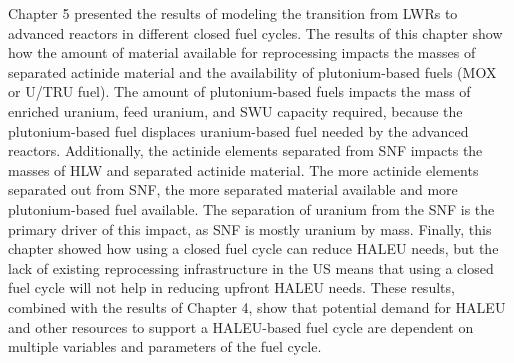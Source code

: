 Chapter 5 presented the results of modeling the transition from 
\glspl{LWR} to advanced reactors in different closed fuel cycles. 
The results of this chapter show how the amount of material 
available for reprocessing impacts the masses of separated 
actinide material and the availability of plutonium-based 
fuels (\gls{MOX} or U/TRU fuel). The amount of plutonium-based 
fuels impacts the 
mass of enriched uranium, feed uranium, and \gls{SWU} 
capacity required, because the plutonium-based fuel displaces 
uranium-based fuel needed by the advanced reactors. Additionally,
the actinide elements 
separated from \gls{SNF} impacts the masses of \gls{HLW} and separated 
actinide material. The more actinide elements separated out from 
\gls{SNF}, the more separated material available and more 
plutonium-based fuel available. The separation of uranium from the 
\gls{SNF} is the primary driver of this impact, as 
\gls{SNF} is mostly uranium by mass. Finally, this chapter 
showed how using a closed fuel cycle can reduce \gls{HALEU} 
needs, but the lack of existing reprocessing infrastructure 
in the US means that using a closed fuel cycle will not help 
in reducing upfront \gls{HALEU} needs. 
These results, combined 
with the results of Chapter 4, show that potential demand for 
\gls{HALEU} and other resources to support a \gls{HALEU}-based 
fuel cycle are dependent on multiple variables and parameters 
of the fuel cycle. 

